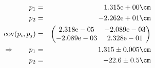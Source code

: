 \begin{eqnarray}
    p_1 &=& 1.315\mathrm{e}+00 \cm \nonumber \\
    p_2 &=& -2.262\mathrm{e}+01 \cm \nonumber \\
    \mathrm{cov}(p_i, p_j) &=& 
    \begin{pmatrix}
        2.318\mathrm{e}-05 &-2.089\mathrm{e}-03 \\
        -2.089\mathrm{e}-03 &2.328\mathrm{e}-01 \\
    \end{pmatrix}
\\ \Rightarrow \qquad
    p_1 &=& 1.315 \pm 0.005 \cm\\
    p_2 &=& -22.6 \pm 0.5 \cm
\end{eqnarray}

